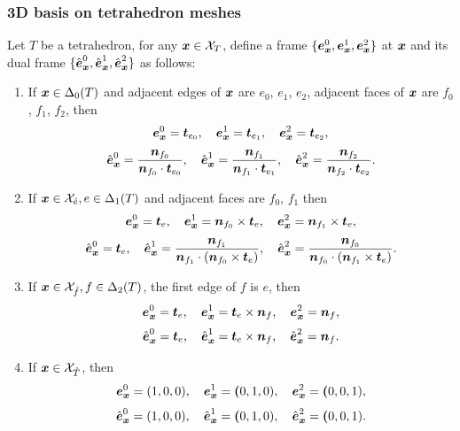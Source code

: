 \documentclass[mathpazo]{cicp}
\begin{document}
\subsubsection{3D basis on tetrahedron meshes}
  Let $T$ be a tetrahedron, for any $\boldsymbol x \in \mathcal X_{T}$, 
  define a frame $\{\boldsymbol e_{\boldsymbol x}^0, \boldsymbol e_{\boldsymbol x}^1, \boldsymbol e_{\boldsymbol x}^2\}$ 
  at $\boldsymbol x$ and its dual frame 
  $\{\hat {\boldsymbol e}_{\boldsymbol x}^0, \hat{\boldsymbol e}_{\boldsymbol x}^1, \hat{\boldsymbol e}_{\boldsymbol x}^2\}$ 
  as follows:
\begin{enumerate}
  \item If $\boldsymbol x \in \Delta_0(T)$ and adjacent edges of $\boldsymbol x$ are 
    $e_0$, $e_1$, $e_2$, adjacent faces of $\boldsymbol x$ are 
    $f_0$, $f_1$, $f_2$, then
  $$
  \boldsymbol e_{\boldsymbol x}^0 = \boldsymbol t_{e_0}, \quad 
  \boldsymbol e_{\boldsymbol x}^1 = \boldsymbol t_{e_1}, \quad 
  \boldsymbol e_{\boldsymbol x}^2 = \boldsymbol t_{e_2},
  $$
  $$
  \hat{\boldsymbol e}_{\boldsymbol x}^0 = \frac{\boldsymbol n_{f_0}}{\boldsymbol n_{f_0} 
    \cdot \boldsymbol t_{e_0}}, \quad 
  \hat{\boldsymbol e}_{\boldsymbol x}^1 = \frac{\boldsymbol n_{f_1}}{\boldsymbol n_{f_1} 
    \cdot \boldsymbol t_{e_1}}, \quad 
  \hat{\boldsymbol e}_{\boldsymbol x}^2 = \frac{\boldsymbol n_{f_2}}{\boldsymbol n_{f_2} 
    \cdot \boldsymbol t_{e_2}}.
  $$
  \item If $\boldsymbol x \in \mathcal X_{\mathring{e}}, e \in \Delta_1(T)$ 
    and adjacent faces are $f_0$, $f_1$ then
  $$
  \boldsymbol e_{\boldsymbol x}^0 = \boldsymbol t_{e}, \quad 
  \boldsymbol e_{\boldsymbol x}^1 = \boldsymbol n_{f_0}\times \boldsymbol t_{e}, \quad 
  \boldsymbol e_{\boldsymbol x}^2 = \boldsymbol n_{f_1}\times \boldsymbol t_{e},	
  $$ 
  $$
  \hat{\boldsymbol e}_{\boldsymbol x}^0 = \boldsymbol t_{e}, \quad 
  \hat{\boldsymbol e}_{\boldsymbol x}^1 = \frac{\boldsymbol n_{f_1}}{\boldsymbol n_{f_1} 
    \cdot (\boldsymbol n_{f_0}\times \boldsymbol t_e)}, \quad	
  \hat{\boldsymbol e}_{\boldsymbol x}^2 = \frac{\boldsymbol n_{f_0}}{\boldsymbol n_{f_0} 
    \cdot (\boldsymbol n_{f_1}\times \boldsymbol t_e)}.
  $$
  \item If $\boldsymbol x \in \mathcal X_{\mathring{f}}, f \in \Delta_2(T)$, 
    the first edge of $f$ is $e$, then
  $$
  \boldsymbol e_{\boldsymbol x}^0 = \boldsymbol t_{e}, \quad 
  \boldsymbol e_{\boldsymbol x}^1 = \boldsymbol t_{e} \times \boldsymbol n_f, \quad
  \boldsymbol e_{\boldsymbol x}^2 = \boldsymbol n_{f},
  $$
  $$
  \hat{\boldsymbol e}_{\boldsymbol x}^0 = \boldsymbol t_{e}, \quad 
  \hat{\boldsymbol e}_{\boldsymbol x}^1 = \boldsymbol t_{e} \times \boldsymbol n_f, \quad
  \hat{\boldsymbol e}_{\boldsymbol x}^2 = \boldsymbol n_{f}.	
  $$
  \item If $\boldsymbol x \in \mathcal X_{\mathring{T}}$, then
  $$
  \boldsymbol e_{\boldsymbol x}^0 = (1, 0, 0), \quad 
  \boldsymbol e_{\boldsymbol x}^1 = \boldsymbol (0, 1, 0), \quad 
  \boldsymbol e_{\boldsymbol x}^2 = \boldsymbol (0, 0, 1),
  $$
  $$
  \hat{\boldsymbol e}_{\boldsymbol x}^0 = (1, 0, 0), \quad 
  \hat{\boldsymbol e}_{\boldsymbol x}^1 = \boldsymbol (0, 1, 0), \quad 
  \hat{\boldsymbol e}_{\boldsymbol x}^2 = \boldsymbol (0, 0, 1).
  $$
\end{enumerate}
\end{document}
